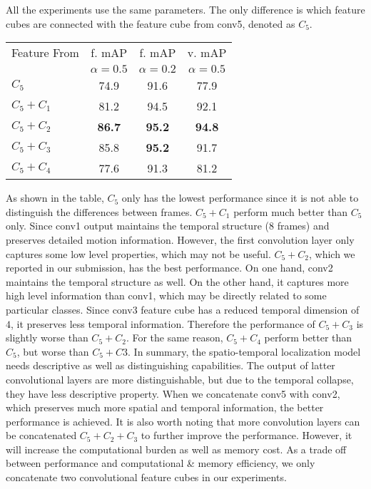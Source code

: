 \documentclass[10pt,twocolumn,letterpaper]{article}
\begin{document}
All the experiments use the same parameters. The only difference is which feature cubes are connected with the feature cube from conv5, denoted as $C_5$.

\begin{table}[!hpbt]
\begin{center}
\begin{tabular}{l|c|cc}
\hline
Feature From        & f. mAP        & f. mAP        & v. mAP \\
                    & $\alpha = 0.5$& $\alpha = 0.2$& $\alpha = 0.5$ \\
\hline
$C_5$               & 74.9          & 91.6          & 77.9 \\
$C_5 + C_1$         & 81.2          & 94.5          & 92.1 \\
$C_5 + C_2$         & \textbf{86.7} & \textbf{95.2} & \textbf{94.8} \\
$C_5 + C_3$         & 85.8          & \textbf{95.2} & 91.7 \\
$C_5 + C_4$         & 77.6          & 91.3          & 81.2 \\
\hline
\end{tabular}
\end{center}
\end{table}

As shown in the table, $C_5$ only has the lowest performance since it is not able to distinguish the differences between frames. $C_5 + C_1$ perform much better than $C_5$ only. Since conv1 output maintains the temporal structure (8 frames) and preserves detailed motion information. However, the first convolution layer only captures some low level properties, which may not be useful. $C_5 + C_2$, which we reported in our submission, has the best performance. On one hand, conv2 maintains the temporal structure as well. On the other hand, it captures more high level information than conv1, which may be directly related to some particular classes. Since conv3 feature cube has a reduced temporal dimension of $4$, it preserves less temporal information. Therefore the performance of $C_5 + C_3$ is slightly worse than $C_5 + C_2$. For the same reason, $C_5 + C_4$ perform better than $C_5$, but worse than $C_5 + C3$. In summary, the spatio-temporal localization model needs descriptive as well as distinguishing capabilities. The output of latter convolutional layers are more distinguishable, but due to the temporal collapse, they have less descriptive property. When we concatenate conv5 with conv2, which preserves much more  spatial and temporal information, the better performance is achieved. It is also worth noting that more convolution layers can be concatenated \eg $C_5 + C_2 + C_3$ to further improve the performance. However, it will increase the computational burden as well as memory cost. As a trade off between performance and computational \& memory efficiency, we only concatenate two convolutional feature cubes in our experiments.
\end{document}
